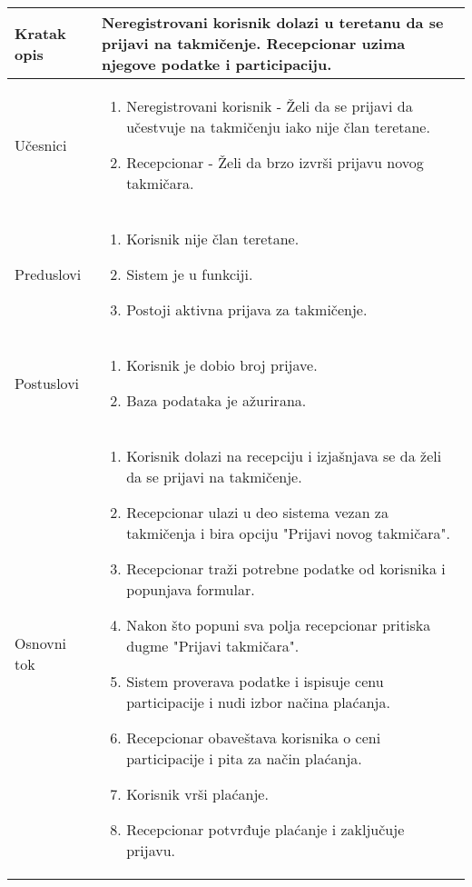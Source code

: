 \documentclass[../../main.tex]{subfiles}
\begin{document}
\begin{longtable}{| p{} | p{} |} 
\hline
    Kratak opis &  Neregistrovani korisnik dolazi u teretanu da se prijavi na takmičenje. Recepcionar uzima njegove podatke i participaciju. \\ 
\hline    
    Učesnici & \begin{enumerate}
        \item Neregistrovani korisnik - Želi da se prijavi da učestvuje na takmičenju iako nije član teretane.
        \item Recepcionar - Želi da brzo izvrši prijavu novog takmičara.
    \end{enumerate}\\
\hline
   Preduslovi & \begin{enumerate}
       \item Korisnik nije član teretane.
       \item Sistem je u funkciji.
       \item Postoji aktivna prijava za takmičenje.
   \end{enumerate}\\
\hline  
    Postuslovi & \begin{enumerate}
        \item Korisnik je dobio broj prijave.
        \item Baza podataka je ažurirana.
    \end{enumerate}\\
\hline
    Osnovni tok & \begin{enumerate}
        \item Korisnik dolazi na recepciju i izjašnjava se da želi da se prijavi na takmičenje.
        \item Recepcionar ulazi u deo sistema vezan za takmičenja i bira opciju "Prijavi novog takmičara".
        \item Recepcionar traži potrebne podatke od korisnika i popunjava formular. 
        \item Nakon što popuni sva polja recepcionar pritiska dugme "Prijavi takmičara".
        \item Sistem proverava podatke i ispisuje cenu participacije i nudi izbor načina plaćanja.
        \item Recepcionar obaveštava korisnika o ceni participacije i pita za način plaćanja.
        \item Korisnik vrši plaćanje.
        \item Recepcionar potvrđuje plaćanje i zaključuje prijavu.

\end{enumerate}
\end{longtable}
\end{document}
